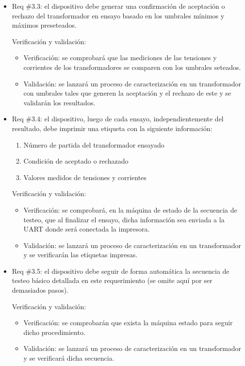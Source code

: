 \documentclass[11pt]{charter}
\begin{document}
\begin{itemize} 
\item Req \#3.3: el dispositivo debe generar una confirmación de aceptación o rechazo del transformador en ensayo basado en los umbrales mínimos y máximos preseteados.

Verificación y validación:

\begin{itemize}
\item Verificación: se comprobará que las mediciones de las tensiones y corrientes de los transformadores se comparen con los umbrales seteados.
\item Validación: se lanzará un proceso de caracterización en un transformador con umbrales tales que generen la aceptación y el rechazo de este y se validarán los resultados.
\end{itemize}

\end{itemize}

\begin{itemize} 
\item Req \#3.4: el dispositivo, luego de cada ensayo, independientemente del resultado, debe imprimir una etiqueta con la siguiente información:
                \begin{enumerate}
                \item Número de partida del transformador ensayado
                \item Condición de aceptado o rechazado
                \item Valores medidos de tensiones y corrientes
                \end{enumerate}

Verificación y validación:

\begin{itemize}
\item Verificación: se comprobará, en la máquina de estado de la secuencia de testeo, que al finalizar el ensayo, dicha información sea enviada a la UART donde será conectada la impresora. 
\item Validación: se lanzará un proceso de caracterización en un transformador y se verificarán las etiquetas impresas.
\end{itemize}

\end{itemize}

\begin{itemize} 
\item Req \#3.5: el dispositivo debe seguir de forma automática la secuencia de testeo básico detallada en este requerimiento (se omite aquí por ser demasiados pasos).

Verificación y validación:

\begin{itemize}
\item Verificación: se comprobarán que exista la máquina estado para seguir dicho procedimiento.
\item Validación: se lanzará un proceso de caracterización en un transformador y se verificará dicha secuencia.  
\end{itemize}

\end{itemize}
\end{document}
